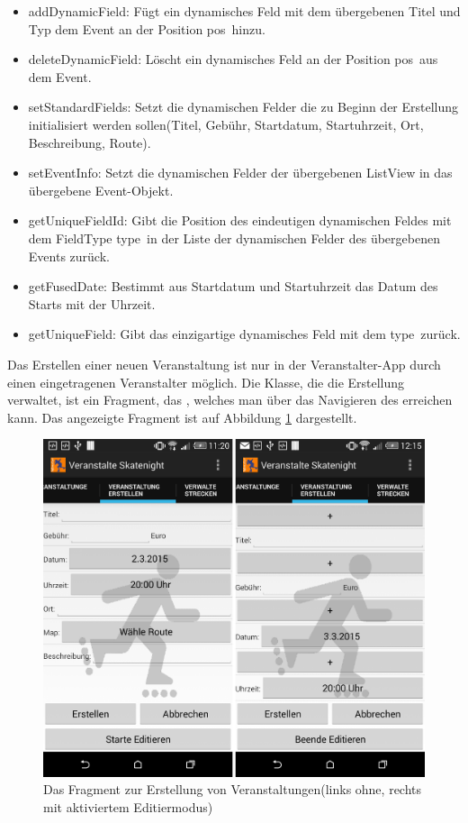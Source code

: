 \begin{itemize}
	\item addDynamicField: Fügt ein dynamisches Feld mit dem übergebenen Titel und Typ dem Event an der Position \glqq pos\grqq\ hinzu.
	\item deleteDynamicField: Löscht ein dynamisches Feld an der Position \glqq pos\grqq\ aus dem Event.
	\item setStandardFields: Setzt die dynamischen Felder die zu Beginn der Erstellung initialisiert werden sollen(Titel, Gebühr, Startdatum, Startuhrzeit, Ort, Beschreibung, Route).
	\item setEventInfo: Setzt die dynamischen Felder der übergebenen ListView in das übergebene Event-Objekt.
	\item getUniqueFieldId: Gibt die Position des eindeutigen dynamischen Feldes mit dem FieldType \glqq type\grqq\ in der Liste der dynamischen Felder des übergebenen Events zurück.
	\item getFusedDate: Bestimmt aus Startdatum und Startuhrzeit das Datum des Starts mit der Uhrzeit.
	\item getUniqueField: Gibt das einzigartige dynamisches Feld mit dem  \glqq type\grqq\ zurück.
\end{itemize}

Das Erstellen einer neuen Veranstaltung ist nur in der Veranstalter-App durch einen eingetragenen Veranstalter möglich. Die Klasse, die die Erstellung verwaltet, ist ein Fragment, das , welches man über das Navigieren des  erreichen kann. Das angezeigte Fragment ist auf Abbildung \ref{fig:VeranstaltungErstellen} dargestellt.\\

\begin{figure}[htb]
\centering
\includegraphics[width=12 cm]{graphics/Fragment_Veranstaltung_erstellen.png}
\caption{Das Fragment zur Erstellung von Veranstaltungen(links ohne, rechts mit aktiviertem Editiermodus)}
\label{fig:VeranstaltungErstellen}
\end{figure}

